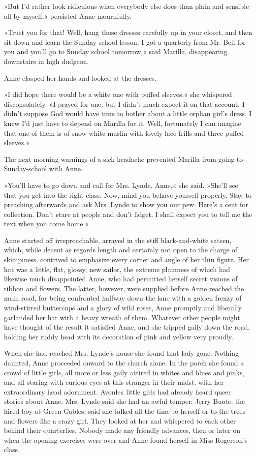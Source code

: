 »But I'd rather look ridiculous when everybody else does than plain and sensible all by myself,« persisted Anne mournfully.

»Trust you for that! Well, hang those dresses carefully up in your closet, and then sit down and learn the Sunday school lesson. I got a quarterly from Mr. Bell for you and you'll go to Sunday school tomorrow,« said Marilla, disappearing downstairs in high dudgeon.

Anne clasped her hands and looked at the dresses.

»I did hope there would be a white one with puffed sleeves,« she whispered disconsolately. »I prayed for one, but I didn't much expect it on that account. I didn't suppose God would have time to bother about a little orphan girl's dress. I knew I'd just have to depend on Marilla for it. Well, fortunately I can imagine that one of them is of snow-white muslin with lovely lace frills and three-puffed sleeves.«

The next morning warnings of a sick headache prevented Marilla from going to Sunday-school with Anne.

»You'll have to go down and call for Mrs. Lynde, Anne,« she said. »She'll see that you get into the right class. Now, mind you behave yourself properly. Stay to preaching afterwards and ask Mrs. Lynde to show you our pew. Here's a cent for collection. Don't stare at people and don't fidget. I shall expect you to tell me the text when you come home.«

Anne started off irreproachable, arrayed in the stiff black-and-white sateen, which, while decent as regards length and certainly not open to the charge of skimpiness, contrived to emphasize every corner and angle of her thin figure. Her hat was a little, flat, glossy, new sailor, the extreme plainness of which had likewise much disappointed Anne, who had permitted herself secret visions of ribbon and flowers. The latter, however, were supplied before Anne reached the main road, for being confronted halfway down the lane with a golden frenzy of wind-stirred buttercups and a glory of wild roses, Anne promptly and liberally garlanded her hat with a heavy wreath of them. Whatever other people might have thought of the result it satisfied Anne, and she tripped gaily down the road, holding her ruddy head with its decoration of pink and yellow very proudly.

When she had reached Mrs. Lynde's house she found that lady gone. Nothing daunted, Anne proceeded onward to the church alone. In the porch she found a crowd of little girls, all more or less gaily attired in whites and blues and pinks, and all staring with curious eyes at this stranger in their midst, with her extraordinary head adornment. Avonlea little girls had already heard queer stories about Anne. Mrs. Lynde said she had an awful temper; Jerry Buote, the hired boy at Green Gables, said she talked all the time to herself or to the trees and flowers like a crazy girl. They looked at her and whispered to each other behind their quarterlies. Nobody made any friendly advances, then or later on when the opening exercises were over and Anne found herself in Miss Rogerson's class.

